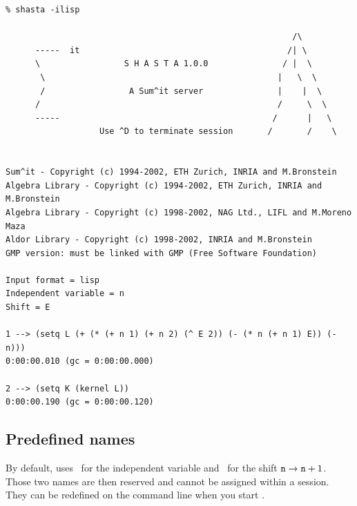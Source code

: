 \pagebreak
\begin{verbatim}
% shasta -ilisp

                                                          /\    
      -----  it                                          /| \    
      \                 S H A S T A 1.0.0               / |  \    
       \                                               |   \  \   
       /                 A Sum^it server               |    |  \  
      /                                                /     \  \ 
      -----                                           /      |   \
                   Use ^D to terminate session       /       /    \


Sum^it - Copyright (c) 1994-2002, ETH Zurich, INRIA and M.Bronstein
Algebra Library - Copyright (c) 1994-2002, ETH Zurich, INRIA and M.Bronstein
Algebra Library - Copyright (c) 1998-2002, NAG Ltd., LIFL and M.Moreno Maza
Aldor Library - Copyright (c) 1998-2002, INRIA and M.Bronstein
GMP version: must be linked with GMP (Free Software Foundation)

Input format = lisp
Independent variable = n
Shift = E

1 --> (setq L (+ (* (+ n 1) (+ n 2) (^ E 2)) (- (* n (+ n 1) E)) (- n)))
0:00:00.010 (gc = 0:00:00.000)

2 --> (setq K (kernel L))
0:00:00.190 (gc = 0:00:00.120)
\end{verbatim}

\subsection{Predefined names}
By default, \shasta{} uses \nn~for the independent variable and
\EE~for the shift ${\tt n} \to {\tt n} + 1$. Those two names are
then reserved and cannot be assigned within a session. They can
be redefined on the command line when you start \shasta.

